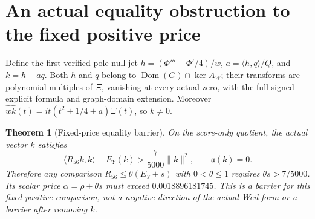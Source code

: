 \documentclass[12pt]{article}
\newtheorem{theorem}{Theorem}[section]
\theoremstyle{remark}\newtheorem{remark}[theorem]{Remark}
\newcommand{\Dom}{\operatorname{Dom}}
\begin{document}
\section{An actual equality obstruction to the fixed positive price}
Define the first verified pole-null jet $h=(\Phi'''-\Phi'/4)/w$,
$a=\langle h,q\rangle/Q$, and $k=h-aq$. Both $h$ and $q$ belong
to $\Dom(G)\cap\ker A_W$; their transforms are polynomial multiples
of $\Xi$, vanishing at every actual zero, with the full signed
explicit formula and graph-domain extension. Moreover
$\widehat{wk}(t)=it(t^2+1/4+a)\Xi(t)$, so $k\ne0$.
\begin{theorem}[Fixed-price equality barrier]\label{barrier}
On the score-only quotient, the actual vector $k$ satisfies
\[
 \langle R_{56}k,k\rangle-E_Y(k)>\frac7{5000}\|k\|^2,
 \qquad \mathfrak a(k)=0.
\]
Therefore any comparison $R_{56}\le\theta(E_Y+s)$ with
$0<\theta\le1$ requires $\theta s>7/5000$. Its scalar price
$\alpha=\rho+\theta s$ must exceed $0.0018896181745$.
This is a barrier for this fixed positive comparison, not a negative
direction of the actual Weil form or a barrier after removing $k$.
\end{theorem}
\end{document}
